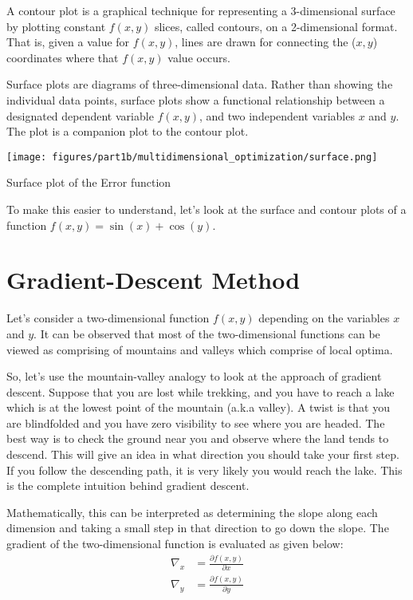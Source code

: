 \documentclass[book.tex]{subfiles}
\begin{document}
A contour plot is a graphical technique for representing a 3-dimensional surface by plotting constant $f(x,y)$ slices, called contours, on a 2-dimensional format. That is, given a value for $f(x,y)$, lines are drawn for connecting the ($x,y$) coordinates where that $f(x,y)$ value occurs.

Surface plots are diagrams of three-dimensional data. Rather than showing the individual data points, surface plots show a functional relationship between a designated dependent variable $f(x,y)$, and two independent variables $x$ and $y$. The plot is a companion plot to the contour plot.

\begin{marginfigure}
	\centering
	\texttt{[image: figures/part1b/multidimensional\_optimization/surface.png]}
	\centering
	\caption{Surface plot of the Error function}
	\label{fig:2}
\end{marginfigure}

To make this easier to understand, let's look at the surface and contour plots of a function $f(x,y) = \sin(x) + \cos(y)$.  %

\section{Gradient-Descent Method}
Let's consider a two-dimensional function $f(x,y)$ depending on the variables $x$ and $y$. It can be observed that most of the two-dimensional functions can be viewed as comprising of mountains and valleys which comprise of local optima.
	
So, let's use the mountain-valley analogy to look at the approach of gradient descent. Suppose that you are lost while trekking, and you have to reach a lake which is at the lowest point of the mountain (a.k.a valley). A twist is that you are blindfolded and you have zero visibility to see where you are headed. The best way is to check the ground near you and observe where the land tends to descend. This will give an idea in what direction you should take your first step. If you follow the descending path, it is very likely you would reach the lake. This is the complete intuition behind gradient descent.
	
Mathematically, this can be interpreted as determining the slope along each dimension and taking a small step in that direction to go down the slope.	The gradient of the two-dimensional function is evaluated as given below:
\begin{align}
\nabla_x &= \frac{\partial f(x,y)}{\partial x}\\
\nabla_y &= \frac{\partial f(x,y)}{\partial y}
\end{align}
	
\end{document}
